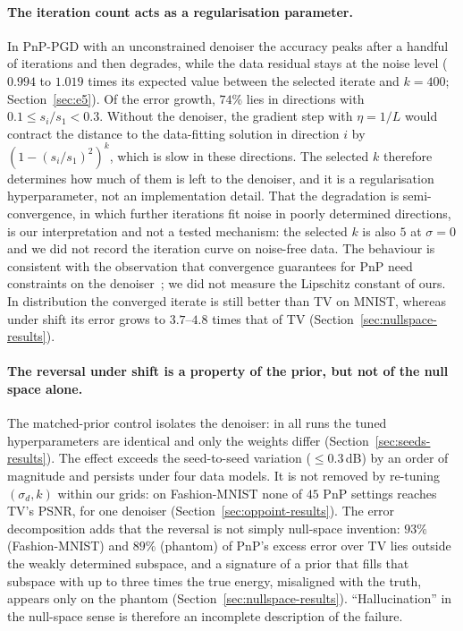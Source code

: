 \paragraph{The iteration count acts as a regularisation parameter.}
In PnP-PGD with an unconstrained denoiser the accuracy peaks after a handful of iterations and then degrades, while the data residual stays at the noise level ($0.994$ to $1.019$ times its expected value between the selected iterate and $k=400$; Section~\ref{sec:e5}). Of the error growth, $74\%$ lies in directions with $0.1\le s_i/s_1<0.3$. Without the denoiser, the gradient step with $\eta=1/L$ would contract the distance to the data-fitting solution in direction $i$ by $(1-(s_i/s_1)^2)^k$, which is slow in these directions. The selected $k$ therefore determines how much of them is left to the denoiser, and it is a regularisation hyperparameter, not an implementation detail.
That the degradation is semi-convergence, in which further iterations fit noise in poorly determined directions, is our interpretation and not a tested mechanism: the selected $k$ is also $5$ at $\sigma=0$ and we did not record the iteration curve on noise-free data. The behaviour is consistent with the observation that convergence guarantees for PnP need constraints on the denoiser~\citep{ryu2019pnp}; we did not measure the Lipschitz constant of ours. In distribution the converged iterate is still better than TV on MNIST, whereas under shift its error grows to $3.7$--$4.8$ times that of TV (Section~\ref{sec:nullspace-results}).

\paragraph{The reversal under shift is a property of the prior, but not of the null space alone.}
The matched-prior control isolates the denoiser: in all runs the tuned hyperparameters are identical and only the weights differ (Section~\ref{sec:seeds-results}). The effect exceeds the seed-to-seed variation ($\le0.3$\,dB) by an order of magnitude and persists under four data models. It is not removed by re-tuning $(\sigma_d,k)$ within our grids: on Fashion-MNIST none of $45$ PnP settings reaches TV's PSNR, for one denoiser (Section~\ref{sec:oppoint-results}).
The error decomposition adds that the reversal is not simply null-space invention: $93\%$ (Fashion-MNIST) and $89\%$ (phantom) of PnP's excess error over TV lies outside the weakly determined subspace, and a signature of a prior that fills that subspace with up to three times the true energy, misaligned with the truth, appears only on the phantom (Section~\ref{sec:nullspace-results}). ``Hallucination'' in the null-space sense is therefore an incomplete description of the failure.

